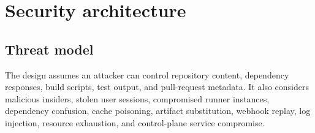\section{Security architecture}

\subsection{Threat model}

The design assumes an attacker can control repository content, dependency responses,
build scripts, test output, and pull-request metadata. It also considers malicious
insiders, stolen user sessions, compromised runner instances, dependency confusion,
cache poisoning, artifact substitution, webhook replay, log injection, resource
exhaustion, and control-plane service compromise.

